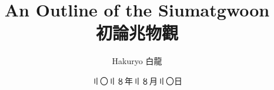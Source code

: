 \documentclass[9pt]{article}
\title{An Outline of the Siumatgwoon \\ 初論兆物觀}
\author{Hakuryo 白龍}
\date{〢〇〢〥年〢〥月〢〇日}
\begin{document}
\sloppy

\jcz{}


\maketitle










\end{document}
